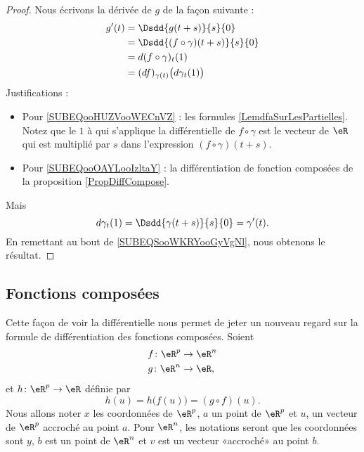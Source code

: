 \begin{proof}
	Nous écrivons la dérivée de \( g\) de la façon suivante :
	\begin{subequations}        \label{SUBEQSooWKRYooGyVgNl}
		\begin{align}
			g'(t) & =\Dsdd{ g(t+s) }{s}{0}                                                \\
			      & =\Dsdd{ (f\circ \gamma)(t+s) }{s}{0}                                  \\
			      & =d(f\circ \gamma)_t(1) \label{SUBEQooHUZVooWECnVZ}                    \\
			      & =(df)_{\gamma(t)}\big( d\gamma_t(1) \big) \label{SUBEQooOAYLooIzltaY} \\
		\end{align}
	\end{subequations}
	Justifications :
	\begin{itemize}
		\item Pour \eqref{SUBEQooHUZVooWECnVZ} : les formules \eqref{LemdfaSurLesPartielles}. Notez que le \( 1\) à qui s'applique la différentielle de \( f\circ\gamma\) est le vecteur de \( \eR\) qui est multiplié par \( s\) dans l'expression \( (f\circ\gamma)(t+s)\).
		\item
		      Pour \eqref{SUBEQooOAYLooIzltaY} : la différentiation de fonction composées de la proposition \ref{PropDiffCompose}.
	\end{itemize}
	Mais
	\begin{equation}
		d\gamma_t(1)=\Dsdd{ \gamma(t+s) }{s}{0}=\gamma'(t).
	\end{equation}
	En remettant au bout de \eqref{SUBEQSooWKRYooGyVgNl}, nous obtenons le résultat.
\end{proof}

\subsection{Fonctions composées}

Cette façon de voir la différentielle nous permet de jeter un nouveau regard sur la formule de différentiation des fonctions composées. Soient
\begin{equation}
	\begin{aligned}[]
		f\colon \eR^p & \to \eR^n \\
		g\colon \eR^n & \to \eR,
	\end{aligned}
\end{equation}
et $h\colon \eR^p\to \eR$ définie par
\begin{equation}
	h(u)=h\big( f(u) \big)=(g\circ f)(u).
\end{equation}
Nous allons noter $x$ les coordonnées de $\eR^p$, $a$ un point de $\eR^p$ et $u$, un vecteur de $\eR^p$ accroché au point $a$. Pour $\eR^n$, les notations seront que les coordonnées sont $y$, $b$ est un point de $\eR^n$ et $v$ est un vecteur «accroché» au point $b$.

